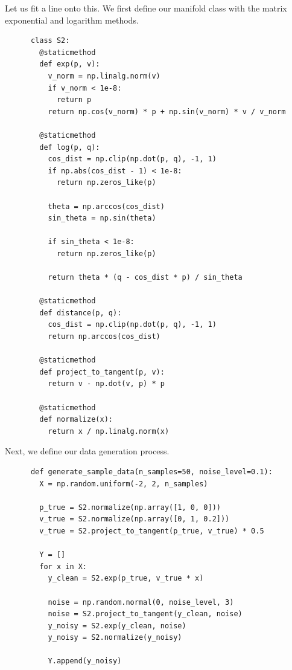   \begin{example}
    Let us fit a line onto this. We first define our manifold class with the matrix exponential and logarithm methods. 

    \begin{lstlisting}
      class S2:
        @staticmethod
        def exp(p, v):
          v_norm = np.linalg.norm(v)
          if v_norm < 1e-8:
            return p
          return np.cos(v_norm) * p + np.sin(v_norm) * v / v_norm
        
        @staticmethod
        def log(p, q):
          cos_dist = np.clip(np.dot(p, q), -1, 1)
          if np.abs(cos_dist - 1) < 1e-8:
            return np.zeros_like(p)
          
          theta = np.arccos(cos_dist)
          sin_theta = np.sin(theta)
          
          if sin_theta < 1e-8:
            return np.zeros_like(p)
          
          return theta * (q - cos_dist * p) / sin_theta
        
        @staticmethod
        def distance(p, q):
          cos_dist = np.clip(np.dot(p, q), -1, 1)
          return np.arccos(cos_dist)
        
        @staticmethod
        def project_to_tangent(p, v):
          return v - np.dot(v, p) * p
        
        @staticmethod
        def normalize(x):
          return x / np.linalg.norm(x)
    \end{lstlisting}

    Next, we define our data generation process. 

    \begin{lstlisting}
      def generate_sample_data(n_samples=50, noise_level=0.1):
        X = np.random.uniform(-2, 2, n_samples)
        
        p_true = S2.normalize(np.array([1, 0, 0]))
        v_true = S2.normalize(np.array([0, 1, 0.2]))
        v_true = S2.project_to_tangent(p_true, v_true) * 0.5
        
        Y = []
        for x in X:
          y_clean = S2.exp(p_true, v_true * x)
          
          noise = np.random.normal(0, noise_level, 3)
          noise = S2.project_to_tangent(y_clean, noise)
          y_noisy = S2.exp(y_clean, noise)
          y_noisy = S2.normalize(y_noisy)
          
          Y.append(y_noisy)
        

\end{lstlisting}
\end{example}
